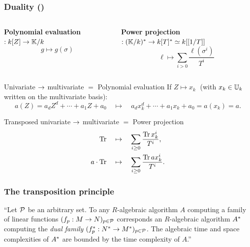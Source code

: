 \documentclass[10pt,usepdftitle=false]{beamer}
\begin{document}

\begin{frame}
  \frametitle{Duality (\cite{shoup95,shoup99,bostan+salvy+schost03})}

  \vspace{-6mm}

  \begin{columns}[b]
    \begin{column}{0.4\textwidth}
      \begin{center}
        \textbf{Polynomial evaluation}$:k[Z]\rightarrow\mathbb{K}/k$
        \[g\mapsto g(\sigma)\]
      \end{center}
    \end{column}
    \begin{column}{0.6\textwidth}
      \begin{center}
        \textbf{Power projection}$:(\mathbb{K}/k)^\ast\rightarrow k[T]^\ast \simeq k[[1/T]]$
        \[\ell \mapsto \sum_{i>0} \frac{\ell(\sigma^i)}{T^i}\]
      \end{center}
    \end{column}
  \end{columns}

  \begin{block}{Univariate $\rightarrow$ multivariate $=$ Polynomial evaluation}
    If $Z \mapsto x_k\;$ (with $x_k\in\mathbb{U}_k$ written on the
    multivariate basis):
    \[a(Z) = a_dZ^d + \cdots + a_1Z + a_0 \quad\mapsto\quad a_dx_k^d + \cdots + a_1x_k + a_0 =a(x_k) = a\text{.}\]
  \end{block}

  \begin{block}{Transposed univariate $\rightarrow$ multivariate $=$ Power projection}
    \begin{align*}
      \operatorname{Tr} &\quad\mapsto\quad \sum_{i\ge0}\frac{\operatorname{Tr} x_k^i}{T^i}\text{,}\\
      a\cdot\operatorname{Tr} &\quad\mapsto\quad \sum_{i\ge0}\frac{\operatorname{Tr} ax_k^i}{T^i}\text{.}
    \end{align*}
  \end{block}
\end{frame}


\begin{frame}
  \frametitle{The transposition principle}

  \large
  
  \begin{theorem}
    ``Let $\mathcal{P}$ be an arbitrary set. To any $R$-algebraic
    algorithm $A$ computing a family of linear functions $(f_p:M\rightarrow
    N)_{p\in\mathcal{P}}$ corresponds an $R$-algebraic algorithm
    $A^\ast$ computing the \emph{dual family}
    $(f^\ast_p:N^\ast\rightarrow M^\ast)_{p\in\mathcal{P}}$. The algebraic
    time and space complexities of $A^\ast$ are bounded by the time
    complexity of $A$.''
  \end{theorem}
  
\end{frame}
\end{document}
